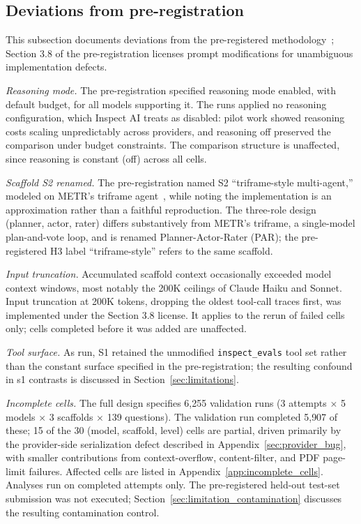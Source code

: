 \documentclass[10pt]{article} %
\begin{document}
    \subsection{Deviations from pre-registration}\label{subsec:deviations}

        This subsection documents deviations from the pre-registered methodology~\citep{starace2026prereg}; Section 3.8 of the pre-registration licenses prompt modifications for unambiguous implementation defects.
        
        \textit{Reasoning mode.} The pre-registration specified reasoning mode enabled, with default budget, for all models supporting it. The runs applied no reasoning configuration, which Inspect AI treats as disabled: pilot work showed reasoning costs scaling unpredictably across providers, and reasoning off preserved the comparison under budget constraints. The comparison structure is unaffected, since reasoning is constant (off) across all cells.
        
        \textit{Scaffold S2 renamed.} The pre-registration named S2 ``triframe-style multi-agent,'' modeled on METR's triframe agent~\citep{kwa2026measuring}, while noting the implementation is an approximation rather than a faithful reproduction. The three-role design (planner, actor, rater) differs substantively from METR's triframe, a single-model plan-and-vote loop, and is renamed Planner-Actor-Rater (PAR); the pre-registered H3 label ``triframe-style'' refers to the same scaffold.

        \textit{Input truncation.} Accumulated scaffold context occasionally exceeded model context windows, most notably the 200K ceilings of Claude Haiku and Sonnet. Input truncation at 200K tokens, dropping the oldest tool-call traces first, was implemented under the Section 3.8 license. It applies to the rerun of failed cells only; cells completed before it was added are unaffected.

        \textit{Tool surface.} As run, S1 retained the unmodified \texttt{inspect\_evals} tool set rather than the constant surface specified in the pre-registration; the resulting confound in s1 contrasts is discussed in Section~\ref{sec:limitations}.
        
        \textit{Incomplete cells.} The full design specifies 6{,}255 validation runs (3 attempts $\times$ 5 models $\times$ 3 scaffolds $\times$ 139 questions). The validation run completed 5{,}907 of these; 15 of the 30 (model, scaffold, level) cells are partial, driven primarily by the provider-side serialization defect described in Appendix~\ref{sec:provider_bug}, with smaller contributions from context-overflow, content-filter, and PDF page-limit failures. Affected cells are listed in Appendix~\ref{app:incomplete_cells}. Analyses run on completed attempts only. The pre-registered held-out test-set submission was not executed; Section~\ref{sec:limitation_contamination} discusses the resulting contamination control.
\end{document}
